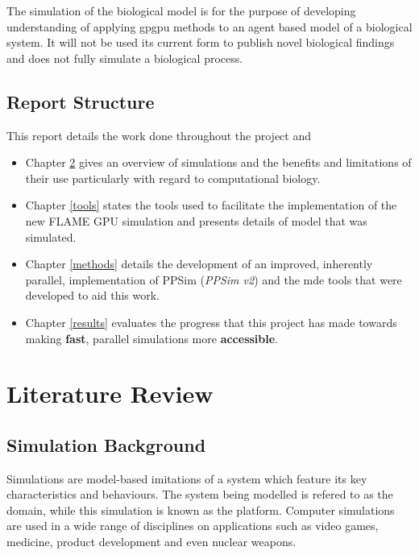 \documentclass{UoYCSproject}
\begin{document}
The simulation of the biological model is for the purpose of developing understanding of applying \gls{gpgpu} methods to an agent based model of a biological system. It will not be used its current form to publish novel biological findings and does not fully simulate a biological process.

\section{Report Structure}
This report details the work done throughout the project and 

\begin{itemize}
    \item Chapter \ref{lit_review} gives an overview of simulations and the benefits and limitations of their use particularly with regard to computational biology.
    \item Chapter \ref{tools} states the tools used to facilitate the implementation of the new \gls{FLAME GPU} simulation and presents details of model that was simulated.
    \item Chapter \ref{methods} details the development of an improved, inherently parallel, implementation of PPSim (\textit{PPSim v2}) and the \gls{mde} tools that were developed to aid this work.
    \item Chapter \ref{results} evaluates the progress that this project has made towards making \textbf{fast}, parallel simulations more \textbf{accessible}.
\end{itemize}

\chapter{Literature Review}
\label{lit_review}
%

\section{Simulation Background}
\label{simulation}
Simulations are model-based imitations of a system which feature its key characteristics and behaviours.
The system being modelled is refered to as the domain, while this simulation is known as the platform.
Computer simulations are used in a wide range of disciplines on applications such as video games, medicine, product development and even nuclear weapons.
\end{document}
